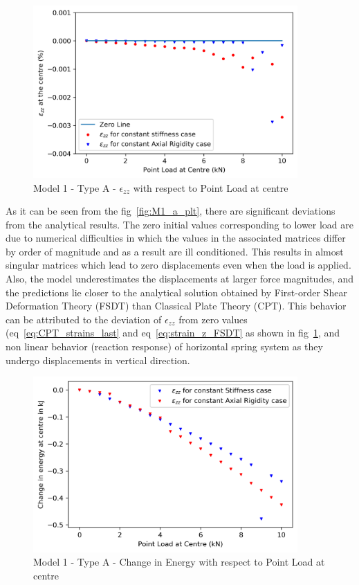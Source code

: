 \begin{figure}[!htbp]
    \centering
    \includegraphics[width = 0.9\textwidth]{Figures/M1_a_strain.png}
    \caption{Model 1 - Type A - $\epsilon_{zz}$ with respect to Point Load at centre}
    \label{fig:M1_a_strain_plt}
\end{figure}

As it can be seen from the fig~\ref{fig:M1_a_plt}, there are significant deviations from the analytical results. The zero initial values corresponding to lower load are due to numerical difficulties in which the values in the associated matrices differ by order of magnitude and as a result are ill conditioned. This results in almost singular matrices which lead to zero displacements even when the load is applied. Also, the model underestimates the displacements at larger force magnitudes, and the predictions lie closer to the analytical solution obtained by First-order Shear Deformation Theory (FSDT) than Classical Plate Theory (CPT). This behavior can be attributed to the deviation of $\epsilon_{zz}$ from zero values (eq~\ref{eq:CPT_strains_last} and eq~\ref{eq:strain_z_FSDT} as shown in fig~\ref{fig:M1_a_strain_plt}, and non linear behavior (reaction response) of horizontal spring system as they undergo displacements in vertical direction.

\begin{figure}[!htbp]
    \centering
    \includegraphics[width = 0.9\textwidth]{Figures/M1_a_energy.png}
    \caption{Model 1 - Type A - Change in Energy with respect to Point Load at centre}
    \label{fig:M1_a_energy}
\end{figure}

